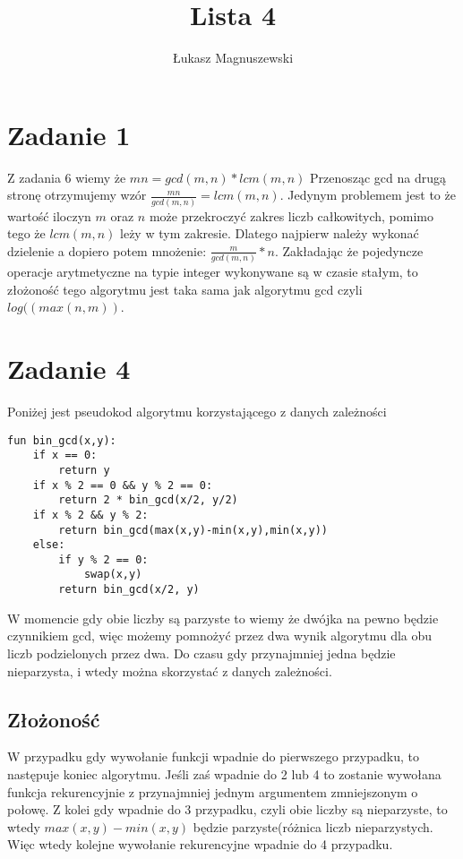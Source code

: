 \documentclass{article}
\title{Lista 4}
\author{Łukasz Magnuszewski}
\date{\vspace{-5ex}}
\begin{document}
\maketitle

\section*{Zadanie 1}

Z zadania 6 wiemy że $mn = gcd(m,n) * lcm(m,n)$ Przenosząc gcd na drugą stronę otrzymujemy wzór $\frac{mn}{gcd(m,n)} = lcm(m,n)$.
Jedynym problemem jest to że wartość iloczyn $m$ oraz $n$ może przekroczyć zakres liczb całkowitych, pomimo tego że $lcm(m,n)$ leży w tym zakresie. Dlatego najpierw należy wykonać dzielenie a dopiero potem mnożenie: $\frac{m}{gcd(m,n)} * n$. Zakładając że pojedyncze operacje arytmetyczne na typie integer wykonywane są w czasie stałym, to złożoność tego algorytmu jest taka sama jak algorytmu gcd czyli $log((max(n,m))$.

\section*{Zadanie 4}
Poniżej jest pseudokod algorytmu korzystającego z danych zależności
\begin{verbatim}
fun bin_gcd(x,y):
    if x == 0:
        return y
    if x % 2 == 0 && y % 2 == 0:
        return 2 * bin_gcd(x/2, y/2)
    if x % 2 && y % 2:
        return bin_gcd(max(x,y)-min(x,y),min(x,y))
    else:
        if y % 2 == 0:
            swap(x,y)
        return bin_gcd(x/2, y)
\end{verbatim}
W momencie gdy obie liczby są parzyste to wiemy że dwójka na pewno będzie czynnikiem gcd, więc możemy pomnożyć przez dwa wynik algorytmu dla obu liczb podzielonych przez dwa. Do czasu gdy przynajmniej jedna będzie nieparzysta, i wtedy można skorzystać z danych zależności.

\subsection*{Złożoność}
W przypadku gdy wywołanie funkcji wpadnie do pierwszego przypadku, to następuje koniec algorytmu. Jeśli zaś wpadnie do 2 lub 4 to zostanie wywołana funkcja rekurencyjnie z przynajmniej jednym argumentem zmniejszonym o połowę. Z kolei gdy wpadnie do 3 przypadku, czyli obie liczby są nieparzyste, to wtedy $max(x,y)-min(x,y)$ będzie parzyste(różnica liczb nieparzystych. Więc wtedy kolejne wywołanie rekurencyjne wpadnie do 4 przypadku.
\end{document}
